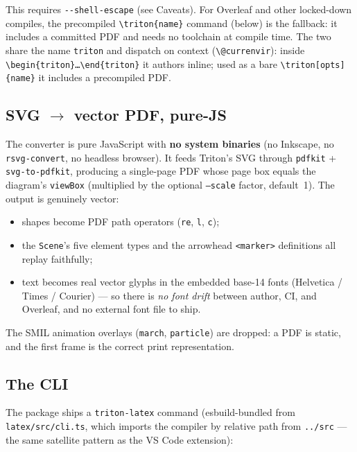 This requires \texttt{-{}-shell-escape} (see Caveats). For Overleaf and other
locked-down compiles, the precompiled \texttt{\textbackslash triton\{name\}} command (below) is
the fallback: it includes a committed PDF and needs no toolchain at compile time.
The two share the name \texttt{triton} and dispatch on context
(\texttt{\textbackslash @currenvir}): inside \texttt{\textbackslash begin\{triton\}\ldots\textbackslash end\{triton\}} it
authors inline; used as a bare \texttt{\textbackslash triton[opts]\{name\}} it includes a
precompiled PDF.

\subsection{SVG \texorpdfstring{$\rightarrow$}{->} vector PDF, pure-JS}

The converter is pure JavaScript with \textbf{no system binaries} (no Inkscape, no
\texttt{rsvg-convert}, no headless browser). It feeds Triton's SVG through
\texttt{pdfkit} + \texttt{svg-to-pdfkit}, producing a single-page PDF whose page
box equals the diagram's \texttt{viewBox} (multiplied by the optional
\texttt{--scale} factor, default~1). The output is genuinely vector:

\begin{itemize}
  \item shapes become PDF path operators (\texttt{re}, \texttt{l}, \texttt{c});
  \item the \texttt{Scene}'s five element types and the arrowhead
        \texttt{<marker>} definitions all replay faithfully;
  \item text becomes real vector glyphs in the embedded base-14 fonts
        (Helvetica / Times / Courier) --- so there is \emph{no font drift}
        between author, CI, and Overleaf, and no external font file to ship.
\end{itemize}

The SMIL animation overlays (\texttt{march}, \texttt{particle}) are dropped: a PDF
is static, and the first frame is the correct print representation.

\subsection{The CLI}

The package ships a \texttt{triton-latex} command (esbuild-bundled from
\texttt{latex/src/cli.ts}, which imports the compiler by relative path from
\texttt{../src} --- the same satellite pattern as the VS Code extension):

